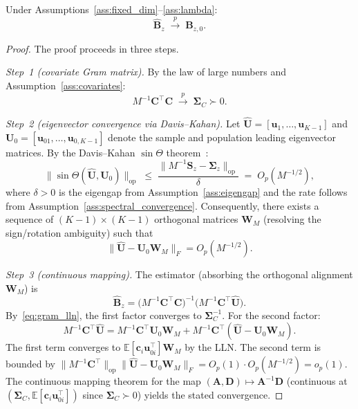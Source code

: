 \begin{theorem}
\label{thm:consistency}
Under
Assumptions~\ref{ass:fixed_dim}--\ref{ass:lambda}:
\[
  \hat{\mathbf{B}}_z
  \;\xrightarrow{p}\;
  \mathbf{B}_{z,0}.
\]
\end{theorem}

\begin{proof}
The proof proceeds in three steps.

\emph{Step~1 (covariate Gram matrix).}
By the law of large numbers and
Assumption~\ref{ass:covariates}:
\begin{equation}
  M^{-1}\mathbf{C}^{\!\top}\mathbf{C}
  \;\xrightarrow{p}\;
  \boldsymbol{\Sigma}_C \succ 0.
  \label{eq:gram_lln}
\end{equation}

\emph{Step~2 (eigenvector convergence via Davis--Kahan).}
Let $\hat{\mathbf{U}} = [\mathbf{u}_1,\dots,\mathbf{u}_{K-1}]$ and
$\mathbf{U}_0 = [\mathbf{u}_{01},\dots,\mathbf{u}_{0,K-1}]$ denote the
sample and population leading eigenvector matrices.
By the Davis--Kahan $\sin\Theta$
theorem~\citep{davis1970rotation}:
\begin{equation}
  \bigl\|
    \sin\Theta(\hat{\mathbf{U}},\mathbf{U}_0)
  \bigr\|_{\mathrm{op}}
  \;\leq\;
  \frac{\|M^{-1}\mathbf{S}_z - \boldsymbol{\Sigma}_z\|_{\mathrm{op}}}
       {\delta}
  \;=\;
  O_p(M^{-1/2}),
  \label{eq:davis_kahan}
\end{equation}
where $\delta>0$ is the eigengap from
Assumption~\ref{ass:eigengap} and the rate follows from
Assumption~\ref{ass:spectral_convergence}.
Consequently, there exists a sequence of $(K{-}1)\times(K{-}1)$
orthogonal matrices $\mathbf{W}_M$ (resolving the sign/rotation
ambiguity) such that
\begin{equation}
  \bigl\|\hat{\mathbf{U}} - \mathbf{U}_0\mathbf{W}_M\bigr\|_F
  = O_p(M^{-1/2}).
  \label{eq:eigvec_convergence}
\end{equation}

\emph{Step~3 (continuous mapping).}
The estimator (absorbing the orthogonal alignment $\mathbf{W}_M$) is
\[
  \hat{\mathbf{B}}_z
  = \bigl(M^{-1}\mathbf{C}^{\!\top}\mathbf{C}\bigr)^{-1}
    \bigl(M^{-1}\mathbf{C}^{\!\top}\hat{\mathbf{U}}\bigr).
\]
By~\eqref{eq:gram_lln}, the first factor converges to
$\boldsymbol{\Sigma}_C^{-1}$.
For the second factor:
\[
  M^{-1}\mathbf{C}^{\!\top}\hat{\mathbf{U}}
  = M^{-1}\mathbf{C}^{\!\top}\mathbf{U}_0\mathbf{W}_M
    + M^{-1}\mathbf{C}^{\!\top}
      (\hat{\mathbf{U}}-\mathbf{U}_0\mathbf{W}_M).
\]
The first term converges to
$\mathbb{E}[\mathbf{c}_i\mathbf{u}_{0i}^{\!\top}]\mathbf{W}_M$ by
the LLN. The second term is bounded by
$\|M^{-1}\mathbf{C}^{\!\top}\|_{\mathrm{op}}
 \|\hat{\mathbf{U}}-\mathbf{U}_0\mathbf{W}_M\|_F
 = O_p(1)\cdot O_p(M^{-1/2}) = o_p(1)$.
The continuous mapping theorem for the map
$(\mathbf{A},\mathbf{D})\mapsto\mathbf{A}^{-1}\mathbf{D}$ (continuous
at $(\boldsymbol{\Sigma}_C, \mathbb{E}[\mathbf{c}_i\mathbf{u}_{0i}^{\!\top}])$
since $\boldsymbol{\Sigma}_C\succ 0$) yields the stated convergence.
\end{proof}


